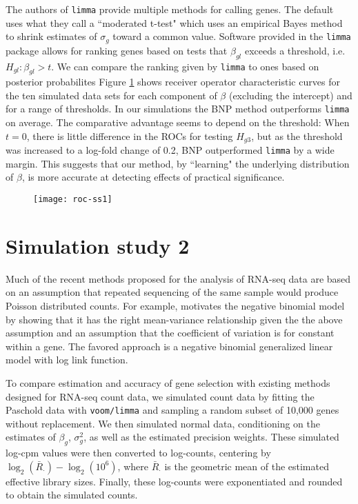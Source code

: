 The authors of \texttt{limma} provide multiple methods for calling genes. The default uses what they call a ``moderated t-test" which uses an empirical Bayes method to shrink estimates of $\sigma_g$ toward a common value. Software provided in the \texttt{limma} package allows for ranking genes based on tests that $\beta_{gl}$ exceeds a threshold, i.e. $H_{gl}:\beta_{gl}>t$. We can compare the ranking given by \texttt{limma} to ones based on posterior probabilites Figure \ref{roc-ss1} shows receiver operator characteristic curves for the ten simulated data sets for each component of $\beta$ (excluding the intercept) and for a range of thresholds. In our simulations the BNP method outperforms \texttt{limma} on average. The comparative advantage seems to depend on the threshold: When $t=0$, there is little difference in the ROCs for testing $H_{g3}$, but as the threshold was increased to a log-fold change of 0.2, BNP outperformed \texttt{limma} by a wide margin. This suggests that our method, by ``learning" the underlying distribution of $\beta$, is more accurate at detecting effects of practical significance.

\begin{figure}
\texttt{[image: roc-ss1]}
\label{roc-ss1}
\end{figure}

\section{Simulation study 2}
Much of the recent methods proposed for the analysis of RNA-seq data are based on an assumption that repeated sequencing of the same sample would produce Poisson distributed counts. For example, \cite{mccarthy} motivates the negative binomial model by showing that it has the right mean-variance relationship given the the above assumption and an assumption that the coefficient of variation is for constant within a gene. The favored approach is a negative binomial generalized linear model with log link function.

To compare estimation and accuracy of gene selection with existing methods designed for RNA-seq count data, we simulated count data by fitting the Paschold data with \texttt{voom/limma} and sampling a random subset of 10,000 genes without replacement. We then simulated normal data, conditioning on the estimates of $\beta_g$, $\sigma^2_g$, as well as the estimated precision weights. These simulated log-cpm values were then converted to log-counts, centering by $\log_2(\bar{R}_\cdot)-\log_2(10^6)$, where $\bar{R}_\cdot$ is the geometric mean of the estimated effective library sizes. Finally, these log-counts were exponentiated and rounded to obtain the simulated counts.


